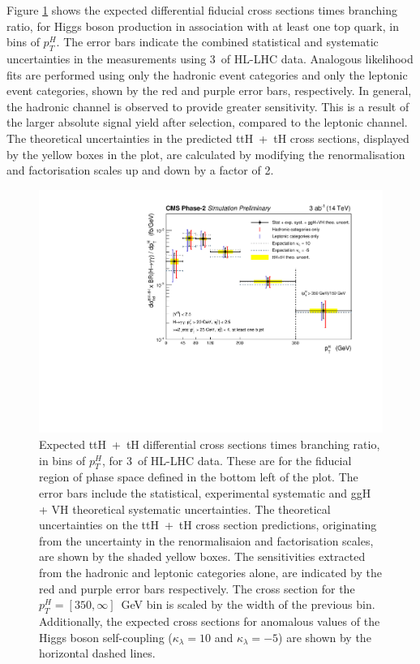 Figure \ref{fig:trilinear_dxs} shows the expected differential fiducial cross sections times branching ratio, for Higgs boson production in association with at least one top quark, in bins of $p_T^H$. The error bars indicate the combined statistical and systematic uncertainties in the measurements using 3~\abinv of HL-LHC data. Analogous likelihood fits are performed using only the hadronic event categories and only the leptonic event categories, shown by the red and purple error bars, respectively. In general, the hadronic channel is observed to provide greater sensitivity. This is a result of the larger absolute signal yield after selection, compared to the leptonic channel. The theoretical uncertainties in the predicted ttH~+~tH cross sections, displayed by the yellow boxes in the plot, are calculated by modifying the renormalisation and factorisation scales up and down by a factor of 2.

\begin{figure}[htb!]
  \centering
  \includegraphics[width=.8\textwidth]{Figures/cms/trilinear/CMS-PAS-FTR-18-020_Figure_006.pdf}
  \caption[Expected top-associated differential $p_T^H$ cross section measurements at the HL-LHC]
  {
    Expected ttH~+~tH differential cross sections times branching ratio, in bins of $p_T^H$, for 3~\abinv of HL-LHC data. These are for the fiducial region of phase space defined in the bottom left of the plot. The error bars include the statistical, experimental systematic and ggH + VH theoretical systematic uncertainties. The theoretical uncertainties on the ttH~+~tH cross section predictions, originating from the uncertainty in the renormalisaion and factorisation scales, are shown by the shaded yellow boxes. The sensitivities extracted from the hadronic and leptonic categories alone, are indicated by the red and purple error bars respectively. The cross section for the $p_T^H=[350,\infty]$~GeV bin is scaled by the width of the previous bin. Additionally, the expected cross sections for anomalous values of the Higgs boson self-coupling ($\kappa_\lambda=10$ and $\kappa_\lambda=-5$) are shown by the horizontal dashed lines.
  }
  \label{fig:trilinear_dxs}
\end{figure}

